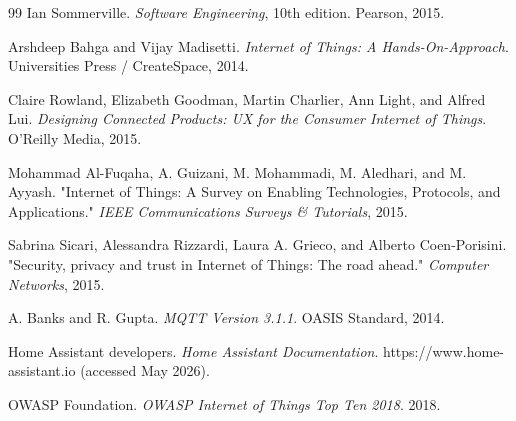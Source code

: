 \newpage
\renewcommand{\refname}{Tài liệu tham khảo}
\renewcommand{\bibname}{Tài liệu tham khảo}
\begin{thebibliography}{99}
Ian Sommerville. \textit{Software Engineering}, 10th edition. Pearson, 2015.

Arshdeep Bahga and Vijay Madisetti. \textit{Internet of Things: A Hands-On-Approach}. Universities Press / CreateSpace, 2014.

Claire Rowland, Elizabeth Goodman, Martin Charlier, Ann Light, and Alfred Lui. \textit{Designing Connected Products: UX for the Consumer Internet of Things}. O'Reilly Media, 2015.

 Mohammad Al-Fuqaha, A. Guizani, M. Mohammadi, M. Aledhari, and M. Ayyash. "Internet of Things: A Survey on Enabling Technologies, Protocols, and Applications." \textit{IEEE Communications Surveys \& Tutorials}, 2015.

Sabrina Sicari, Alessandra Rizzardi, Laura A. Grieco, and Alberto Coen-Porisini. "Security, privacy and trust in Internet of Things: The road ahead." \textit{Computer Networks}, 2015.

A. Banks and R. Gupta. \textit{MQTT Version 3.1.1}. OASIS Standard, 2014.

Home Assistant developers. \textit{Home Assistant Documentation}. https://www.home-assistant.io (accessed May 2026).

OWASP Foundation. \textit{OWASP Internet of Things Top Ten 2018}. 2018.

\end{thebibliography}